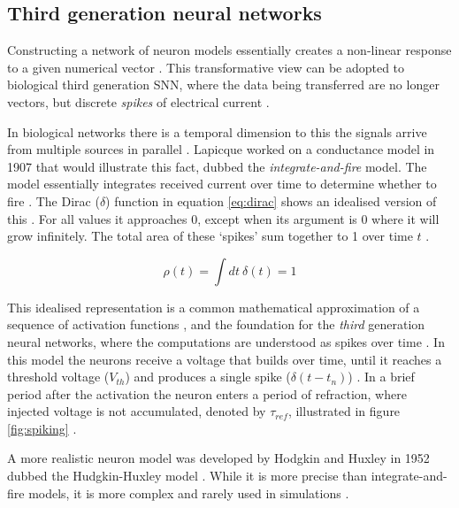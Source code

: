 \documentclass[report.tex]{subfiles}
\begin{document}
\subsection{Third generation neural networks}
Constructing a network of neuron models essentially creates a non-linear
response to a given numerical vector \cite{Russel2007}.
This transformative view can be adopted to biological third generation 
\gls{SNN}, where the data being transferred are no longer vectors, but discrete
\textit{spikes} of electrical current \cite[p. 32]{Dayan2001, Eliasmith2004}.

In biological networks there is a temporal dimension to this the signals
arrive from multiple sources in parallel \cite{Eliasmith2004}.
Lapicque worked on a conductance model in 1907 that would illustrate this fact,
dubbed the \textit{integrate-and-fire} 
model.
The model essentially integrates received current over time
to determine whether to fire
\cite{Dayan2001, Eliasmith2004}.
The Dirac ($\delta$) function 
in equation \ref{eq:dirac} shows an idealised
version of this \cite[p. 404]{Dayan2001}.
For all values it approaches 0, except when its argument is
0 where it will grow infinitely.
The total area of these `spikes' sum together to 1 over time $t$ .

\begin{equation} \label{eq:dirac}
  \rho(t) = \int dt\ \delta(t) = 1
\end{equation}

This idealised representation is a common mathematical approximation of
a sequence of activation functions \cite{Dayan2001, Eliasmith2004},
and the foundation for the \textit{third} generation
neural networks, where the computations are understood as spikes over
time \cite{Maass1997}.  
In this model the neurons receive a voltage that builds over time, until
it reaches a threshold voltage ($V_{th}$) and produces a single spike
\mbox{($\delta(t-t_n)$)}
\cite{Dayan2001, Eliasmith2004}.
In a brief period after the activation the neuron enters a period of
refraction, 
where injected voltage is not accumulated, denoted by 
$\tau_{ref}$, illustrated in figure \ref{fig:spiking}
\cite[p. 82]{Eliasmith2004}.

A more realistic neuron model was developed by Hodgkin
and Huxley in 1952 dubbed the Hudgkin-Huxley model \cite{Dayan2001}.
While it is more precise than integrate-and-fire models, it is
more complex \cite[p. 195]{Dayan2001} and rarely used in simulations
\cite{Albada2018, Dayan2001, Eliasmith2015}.
\end{document}
